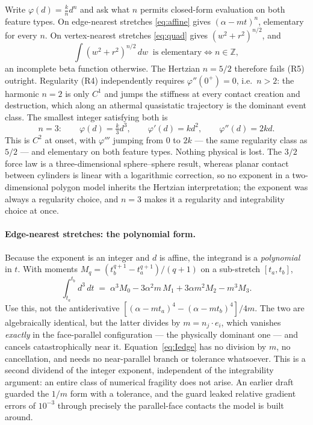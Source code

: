 \documentclass[11pt]{article}
\begin{document}
Write $\varphi(d) = \tfrac{k}{n}d^n$ and ask what $n$ permits closed-form evaluation on both feature types. On edge-nearest stretches \eqref{eq:affine} gives $(\alpha-mt)^n$, elementary for every $n$. On vertex-nearest stretches \eqref{eq:quad} gives $(w^2+r^2)^{n/2}$, and
\begin{equation}
\int(w^2+r^2)^{n/2}\,dw \ \text{ is elementary} \iff n\in\mathbb Z ,
\end{equation}
an incomplete beta function otherwise. The Hertzian $n = 5/2$ therefore fails (R5) outright. Regularity (R4) independently requires $\varphi''(0^+) = 0$, i.e.\ $n>2$: the harmonic $n=2$ is only $C^1$ and jumps the stiffness at every contact creation and destruction, which along an athermal quasistatic trajectory is the dominant event class. The smallest integer satisfying both is
\begin{equation}
\boxed{\;n = 3: \qquad \varphi(d) = \tfrac{k}{3}d^3, \qquad \varphi'(d) = k d^2, \qquad \varphi''(d) = 2kd.\;}
\end{equation}
This is $C^2$ at onset, with $\varphi'''$ jumping from $0$ to $2k$ --- the same regularity class as $5/2$ --- and elementary on both feature types. Nothing physical is lost. The $3/2$ force law is a three-dimensional sphere--sphere result, whereas planar contact between cylinders is linear with a logarithmic correction, so no exponent in a two-dimensional polygon model inherits the Hertzian interpretation; the exponent was always a regularity choice, and $n=3$ makes it a regularity and integrability choice at once.

\paragraph{Edge-nearest stretches: the polynomial form.} Because the exponent is an integer and $d$ is affine, the integrand is a \emph{polynomial} in $t$. With moments $M_q = (t_b^{q+1}-t_a^{q+1})/(q+1)$ on a sub-stretch $[t_a,t_b]$,
\begin{equation}
\int_{t_a}^{t_b}\!\! d^3\,dt \;=\; \alpha^3 M_0 - 3\alpha^2 m\,M_1 + 3\alpha m^2 M_2 - m^3 M_3 .
\label{eq:Iedge}
\end{equation}
Use this, not the antiderivative $[(\alpha-mt_a)^4-(\alpha-mt_b)^4]/4m$. The two are algebraically identical, but the latter divides by $m = n_j\cdot e_i$, which vanishes \emph{exactly} in the face-parallel configuration --- the physically dominant one --- and cancels catastrophically near it. Equation~\eqref{eq:Iedge} has no division by $m$, no cancellation, and needs no near-parallel branch or tolerance whatsoever. This is a second dividend of the integer exponent, independent of the integrability argument: an entire class of numerical fragility does not arise. An earlier draft guarded the $1/m$ form with a tolerance, and the guard leaked relative gradient errors of $10^{-3}$ through precisely the parallel-face contacts the model is built around.
\end{document}
